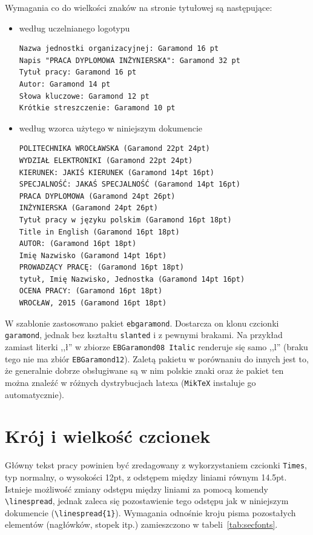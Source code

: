 Wymagania co do wielkości znaków na stronie tytułowej są następujące:
\begin{itemize}
\item według uczelnianego logotypu
\begin{lstlisting}[basicstyle=\footnotesize\ttfamily]
Nazwa jednostki organizacyjnej: Garamond 16 pt 
Napis "PRACA DYPLOMOWA INŻYNIERSKA": Garamond 32 pt 
Tytuł pracy: Garamond 16 pt 
Autor: Garamond 14 pt 
Słowa kluczowe: Garamond 12 pt 
Krótkie streszczenie: Garamond 10 pt 
\end{lstlisting}
\item według wzorca użytego w niniejszym dokumencie
\begin{lstlisting}[basicstyle=\footnotesize\ttfamily]
POLITECHNIKA WROCŁAWSKA (Garamond 22pt 24pt)
WYDZIAŁ ELEKTRONIKI (Garamond 22pt 24pt)
KIERUNEK: JAKIŚ KIERUNEK (Garamond 14pt 16pt)
SPECJALNOŚĆ: JAKAŚ SPECJALNOŚĆ (Garamond 14pt 16pt)
PRACA DYPLOMOWA (Garamond 24pt 26pt)
INŻYNIERSKA (Garamond 24pt 26pt)
Tytuł pracy w języku polskim (Garamond 16pt 18pt)
Title in English (Garamond 16pt 18pt)
AUTOR: (Garamond 16pt 18pt)
Imię Nazwisko (Garamond 14pt 16pt)
PROWADZĄCY PRACĘ: (Garamond 16pt 18pt)
tytuł, Imię Nazwisko, Jednostka (Garamond 14pt 16pt)
OCENA PRACY: (Garamond 16pt 18pt)
WROCŁAW, 2015 (Garamond 16pt 18pt)
\end{lstlisting}
\end{itemize}

W szablonie zastosowano pakiet \texttt{ebgaramond}. Dostarcza on klonu czcionki \texttt{garamond}, jednak bez kształtu \texttt{slanted} i z pewnymi brakami. Na przykład zamiast literki ,,ł'' w zbiorze \texttt{EBGaramond08 Italic} renderuje się samo ,,l'' (braku tego nie ma zbiór \texttt{EBGaramond12}).  Zaletą pakietu  w porównaniu do innych jest to, że generalnie dobrze obsługiwane są w nim polskie znaki oraz że pakiet ten można znaleźć w różnych dystrybucjach latexa (\texttt{MikTeX} instaluje go automatycznie).

\section{Krój i wielkość czcionek}
Główny tekst pracy powinien być zredagowany z wykorzystaniem czcionki \texttt{Times}, typ normalny, o wysokości 12pt, z odstępem między liniami równym 14.5pt. Istnieje możliwość zmiany odstępu między liniami za pomocą komendy \verb?\linespread?, jednak zaleca się pozostawienie tego odstępu jak w niniejszym dokumencie (\verb?\linespread{1}?). Wymagania odnośnie kroju pisma pozostałych elementów (nagłówków, stopek itp.) zamieszczono w tabeli~\ref{tab:secfonts}.

